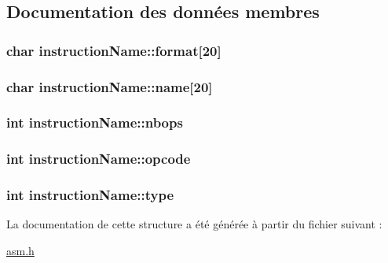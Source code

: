\subsection{Documentation des données membres}
\hypertarget{structinstructionName_ac73dd162380d28a54d16577cb58b2fa1}{
\subsubsection[{format}]{\setlength{\rightskip}{0pt plus 5cm}char instruction\-Name\-::format\mbox{[}20\mbox{]}}}\label{structinstructionName_ac73dd162380d28a54d16577cb58b2fa1}
\hypertarget{structinstructionName_ac88f03a9588140c1b66ebfba4c129f65}{
\subsubsection[{name}]{\setlength{\rightskip}{0pt plus 5cm}char instruction\-Name\-::name\mbox{[}20\mbox{]}}}\label{structinstructionName_ac88f03a9588140c1b66ebfba4c129f65}
\hypertarget{structinstructionName_aecc3848e91d527de92cea2cd25c652d4}{
\subsubsection[{nbops}]{\setlength{\rightskip}{0pt plus 5cm}int instruction\-Name\-::nbops}}\label{structinstructionName_aecc3848e91d527de92cea2cd25c652d4}
\hypertarget{structinstructionName_a17d842830181b704dec1844a0fe8ead9}{
\subsubsection[{opcode}]{\setlength{\rightskip}{0pt plus 5cm}int instruction\-Name\-::opcode}}\label{structinstructionName_a17d842830181b704dec1844a0fe8ead9}
\hypertarget{structinstructionName_a343ced7f4083a1a399a5195b5c6bc8a8}{
\subsubsection[{type}]{\setlength{\rightskip}{0pt plus 5cm}int instruction\-Name\-::type}}\label{structinstructionName_a343ced7f4083a1a399a5195b5c6bc8a8}


La documentation de cette structure a été générée à partir du fichier suivant \-:\begin{DoxyCompactItemize}
\item 
\hyperlink{asm_8h}{asm.\-h}\end{DoxyCompactItemize}
